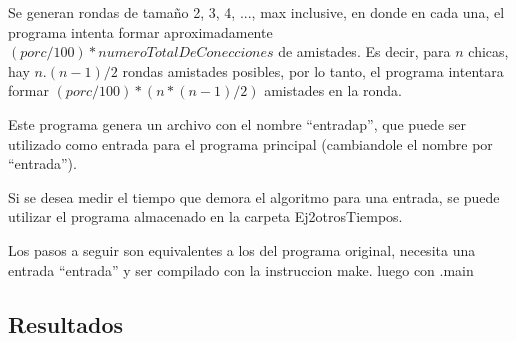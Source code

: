 Se generan rondas de tamaño 2, 3, 4, ..., max inclusive, en donde en cada una, el programa intenta formar aproximadamente $(porc/100)*numeroTotalDeConecciones$ de amistades. Es decir, para $n$ chicas, hay $n$.$(n-1)/2$ rondas amistades posibles, por lo tanto, el programa intentara formar $(porc/100)*(n*(n-1)/2)$ amistades en la ronda.

Este programa genera un archivo con el nombre ``entradap'', que puede ser utilizado como entrada para el programa principal (cambiandole el nombre por ``entrada'').


Si se desea medir el tiempo que demora el algoritmo para una entrada, se puede utilizar el programa almacenado en la carpeta Ej2\/otros\/Tiempos.

Los pasos a seguir son equivalentes a los del programa original, necesita una entrada ``entrada'' y ser compilado con la instruccion make. 
luego con .\/main 

\subsection{Resultados}
\label{resultadosej2}


